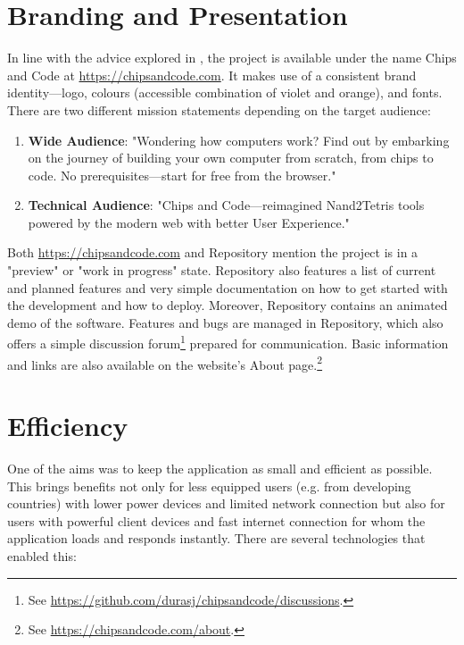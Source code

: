 \section{Branding and Presentation}

In line with the advice explored in , the project is available under the name Chips and Code at \href{chipsandcode.com}{https://chipsandcode.com}.
It makes use of a consistent brand identity---logo, colours (accessible combination of violet and orange), and fonts.
There are two different mission statements depending on the target audience:

\begin{enumerate}
    \item \textbf{Wide Audience}: "Wondering how computers work? Find out by embarking on the journey of building your own computer from scratch, from chips to code. No prerequisites---start for free from the browser."
    \item \textbf{Technical Audience}: "Chips and Code---reimagined Nand2Tetris tools powered by the modern web with better User Experience."
\end{enumerate}

Both \href{chipsandcode.com}{https://chipsandcode.com} and Repository mention the project is in a "preview" or "work in progress" state.
Repository also features a list of current and planned features and very simple documentation on how to get started with the development and how to deploy.
Moreover, Repository contains an animated demo of the software.
Features and bugs are managed in Repository, which also offers a simple discussion forum\footnote{See \url{https://github.com/durasj/chipsandcode/discussions}.} prepared for communication.
Basic information and links are also available on the website's About page.\footnote{See \url{https://chipsandcode.com/about}.}

\section{Efficiency}

One of the aims was to keep the application as small and efficient as possible.
This brings benefits not only for less equipped users (e.g. from developing countries) with lower power devices and limited network connection but also for users with powerful client devices and fast internet connection for whom the application loads and responds instantly.
There are several technologies that enabled this:

